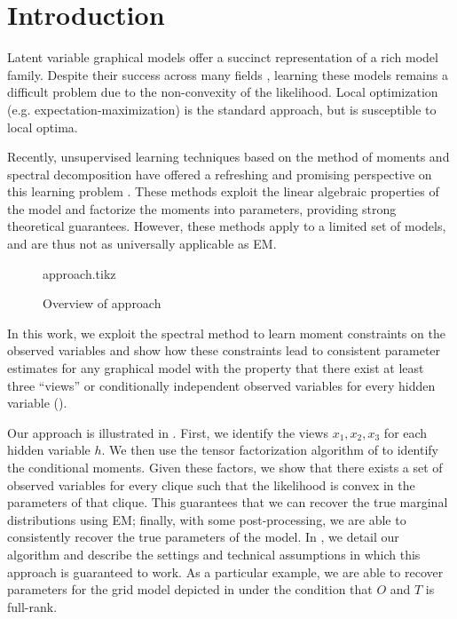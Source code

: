 \section{Introduction}
\label{sec:introduction}

Latent variable graphical models offer a succinct representation of
a rich model family. 
Despite their success across many fields
\cite{quattoni04crf,beaumont2004bayesian,haghighi06prototype,liang06discrimative,kirkpatrick10painless},
learning these models remains a difficult problem due to the
non-convexity of the likelihood. Local optimization (e.g.
expectation-maximization) is the standard approach, but is susceptible
to local optima.

Recently, unsupervised learning techniques based on the method of moments and
spectral decomposition have offered a refreshing and promising perspective on
this learning problem \citep{hsu09spectral,anandkumar11tree,anandkumar12moments,anandkumar12lda,hsu12identifiability,balle11transducer,balle12automata}.
These methods exploit the linear algebraic properties of the model and
factorize the moments into parameters, providing strong theoretical guarantees.
However, these methods apply to a limited set of models, and are thus
not as universally applicable as EM. 

\begin{figure}[t]
  \label{fig:approach}
  \centering
  {approach.tikz}
  \caption{Overview of approach}
\end{figure}

In this work, we exploit the spectral method to learn moment constraints
  on the observed variables and show how these constraints lead to consistent parameter estimates 
  for any graphical model with the property that there exist at least
  three ``views'' or conditionally independent observed variables for
  every hidden variable ().

Our approach is illustrated in . 
First, we identify the views $x_1, x_2, x_3$ for each hidden variable $h$. 
We then use the tensor factorization algorithm of
  \citet{anandkumar12moments,anandkumar13tensor} to identify the
  conditional moments.
Given these factors, we show that there exists a set of observed
  variables for every clique such that the likelihood is convex in the
  parameters of that clique. 
This guarantees that we can recover the true marginal distributions
  using EM; finally, with some post-processing, we are able to
  consistently recover the true parameters of the model.
In , we detail our algorithm and describe the
  settings and technical assumptions in which this approach is guaranteed
  to work.
As a particular example, we are able to recover parameters for the
  grid model depicted in  under the condition that
  $O$ and $T$ is full-rank.

